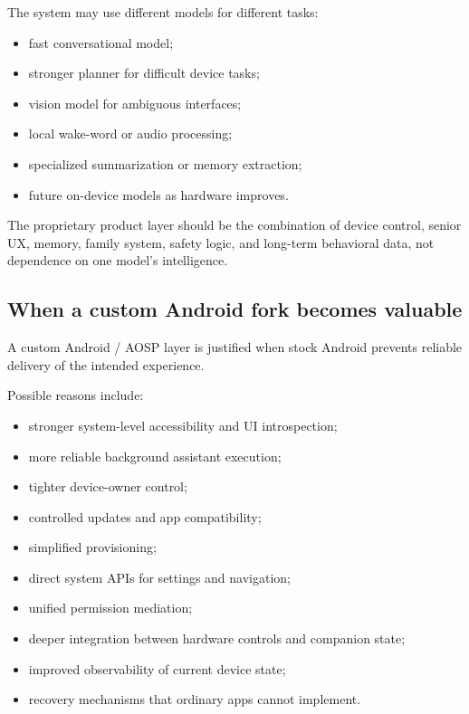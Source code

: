 \documentclass[11pt]{article}
\begin{document}
The system may use different models for different tasks:

\begin{itemize}[leftmargin=*]
    \item fast conversational model;
    \item stronger planner for difficult device tasks;
    \item vision model for ambiguous interfaces;
    \item local wake-word or audio processing;
    \item specialized summarization or memory extraction;
    \item future on-device models as hardware improves.
\end{itemize}

The proprietary product layer should be the combination of device control, senior UX, memory, family system, safety logic, and long-term behavioral data, not dependence on one model's intelligence.

\subsection{When a custom Android fork becomes valuable}
A custom Android / AOSP layer is justified when stock Android prevents reliable delivery of the intended experience.

Possible reasons include:

\begin{itemize}[leftmargin=*]
    \item stronger system-level accessibility and UI introspection;
    \item more reliable background assistant execution;
    \item tighter device-owner control;
    \item controlled updates and app compatibility;
    \item simplified provisioning;
    \item direct system APIs for settings and navigation;
    \item unified permission mediation;
    \item deeper integration between hardware controls and companion state;
    \item improved observability of current device state;
    \item recovery mechanisms that ordinary apps cannot implement.
\end{itemize}
\end{document}
